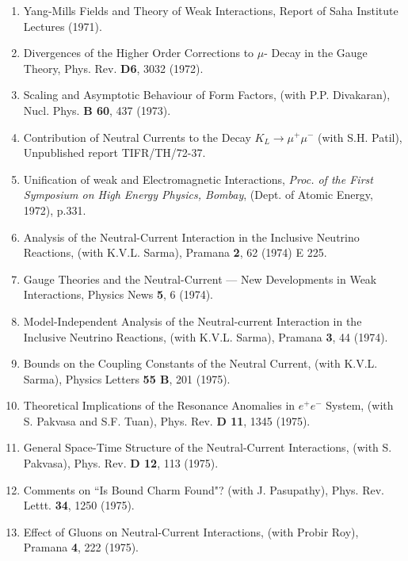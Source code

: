 \begin{enumerate}
\item Yang-Mills Fields and Theory of Weak Interactions, Report of Saha
Institute Lectures (1971).

\item Divergences of the Higher Order Corrections to $\mu$- Decay in the
Gauge Theory, Phys. Rev. {\bf D6}, 3032 (1972).

\item Scaling and Asymptotic Behaviour of Form Factors, (with P.P.
Divakaran), Nucl. Phys. {\bf B 60}, 437 (1973).

\item Contribution of Neutral Currents to the Decay $K_L \rightarrow
\mu^+ \mu^-$ (with S.H. Patil), Unpublished report TIFR/TH/72-37.

\item Unification of weak and Electromagnetic Interactions, {\it Proc. of the
First Symposium on High Energy Physics, Bombay}, (Dept. of Atomic
Energy, 1972), p.331.

\item Analysis of the Neutral-Current Interaction in the Inclusive
Neutrino Reactions, (with K.V.L. Sarma), Pramana {\bf 2}, 62 (1974) E 225.

\item Gauge Theories and the Neutral-Current --- New Developments in Weak
Interactions,  Physics News {\bf 5}, 6 (1974).

\item Model-Independent Analysis of the Neutral-current Interaction in
the Inclusive Neutrino Reactions, (with K.V.L. Sarma), Pramana {\bf 3},
44 (1974).

\item Bounds on the Coupling Constants of the Neutral Current, (with
K.V.L. Sarma), Physics Letters {\bf 55 B}, 201 (1975).

\item Theoretical Implications of the Resonance Anomalies in $e^+ e^-$
System, (with S. Pakvasa and S.F. Tuan), Phys. Rev. {\bf D 11}, 1345 (1975).

\item General Space-Time Structure of the Neutral-Current Interactions,
(with S. Pakvasa), Phys. Rev. {\bf D 12}, 113 (1975).

\item Comments on ``Is Bound Charm Found"? (with J. Pasupathy),
Phys. Rev. Lettt. {\bf 34}, 1250 (1975).

\item Effect of Gluons on Neutral-Current Interactions, (with Probir
Roy), Pramana {\bf 4}, 222 (1975).


\end{enumerate}
